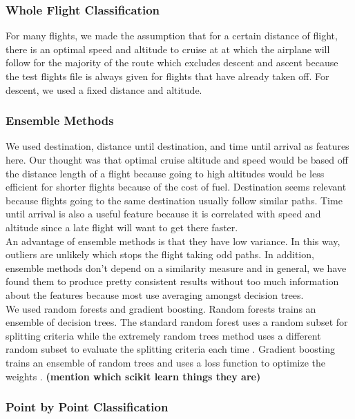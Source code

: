 \documentclass{article}[12pt]
\begin{document}
\begin{multicols}{2}
\subsubsection{Whole Flight Classification}
For many flights, we made the assumption that for a certain distance of flight, there is an optimal speed and altitude to cruise at at which the airplane will follow for the majority of the route which excludes descent and ascent because the test flights file is always given for flights that have already taken off. For descent, we used a fixed distance and altitude.

\subsubsection{Ensemble Methods}
We used destination, distance until destination, and time until arrival as features here. Our thought was that optimal cruise altitude and speed would be based off the distance length of a flight because going to high altitudes would be less efficient for shorter flights because of the cost of fuel. Destination seems relevant because flights going to the same destination usually follow similar paths. Time until arrival is also a useful feature because it is correlated with speed and altitude since a late flight will want to get there faster.
\\

An advantage of ensemble methods is that they have low variance. In this way, outliers are unlikely which stops the flight taking odd paths. In addition, ensemble methods don't depend on a similarity measure and in general, we have found them to produce pretty consistent results without too much information about the features because most use averaging amongst decision trees.\\

We used random forests and gradient boosting. Random forests trains an ensemble of decision trees. The standard random forest uses a random subset for splitting criteria while the extremely random trees method uses a different random subset to evaluate the splitting criteria each time \cite{randomforest}. Gradient boosting trains an ensemble of random trees and uses a loss function to optimize the weights \cite{gradientboost}. 
\textbf{(mention which scikit learn things they are)}

\subsubsection{Point by Point Classification}


\end{multicols}
\end{document}
